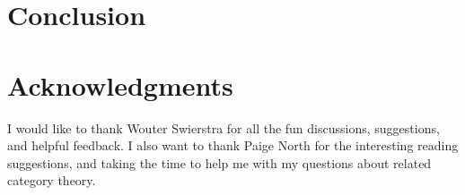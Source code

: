 \documentclass[9pt, final]{article}
\theoremstyle{plain}
\theoremstyle{definition}
\begin{document}



\section{Conclusion}



\section*{Acknowledgments}
I would like to thank Wouter Swierstra for all the fun discussions, suggestions, and helpful feedback. I also want to thank Paige North for the interesting reading suggestions, and taking the time to help me with my questions about related category theory.

\printbibliography


\end{document}

